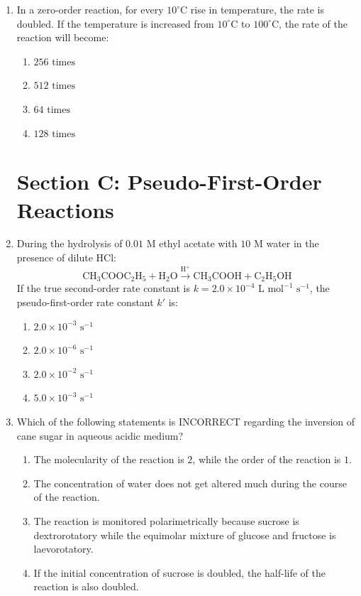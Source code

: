 \documentclass[11pt, a4paper]{article}
\begin{document}
\begin{enumerate}
\item In a zero-order reaction, for every $10^\circ\text{C}$ rise in temperature, the rate is doubled. If the temperature is increased from $10^\circ\text{C}$ to $100^\circ\text{C}$, the rate of the reaction will become:
\begin{enumerate}
    \item $256\text{ times}$
    \item $512\text{ times}$
    \item $64\text{ times}$
    \item $128\text{ times}$
\end{enumerate}

\section*{Section C: Pseudo-First-Order Reactions}

\item During the hydrolysis of $0.01\text{ M}$ ethyl acetate with $10\text{ M}$ water in the presence of dilute $\text{HCl}$:
\[ \text{CH}_3\text{COOC}_2\text{H}_5 + \text{H}_2\text{O} \xrightarrow{\text{H}^+} \text{CH}_3\text{COOH} + \text{C}_2\text{H}_5\text{OH} \]
If the true second-order rate constant is $k = 2.0 \times 10^{-4}\text{ L mol}^{-1}\text{ s}^{-1}$, the pseudo-first-order rate constant $k'$ is:
\begin{enumerate}
    \item $2.0 \times 10^{-3}\text{ s}^{-1}$
    \item $2.0 \times 10^{-6}\text{ s}^{-1}$
    \item $2.0 \times 10^{-2}\text{ s}^{-1}$
    \item $5.0 \times 10^{-3}\text{ s}^{-1}$
\end{enumerate}

\item Which of the following statements is INCORRECT regarding the inversion of cane sugar in aqueous acidic medium?
\begin{enumerate}
    \item The molecularity of the reaction is $2$, while the order of the reaction is $1$.
    \item The concentration of water does not get altered much during the course of the reaction.
    \item The reaction is monitored polarimetrically because sucrose is dextrorotatory while the equimolar mixture of glucose and fructose is laevorotatory.
    \item If the initial concentration of sucrose is doubled, the half-life of the reaction is also doubled.
\end{enumerate}


\end{enumerate}
\end{document}
